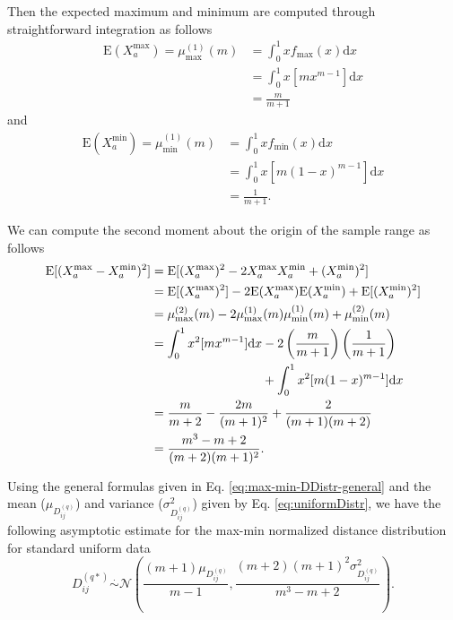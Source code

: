 \documentclass[10pt,letterpaper]{article}\usepackage[]{graphicx}\usepackage[]{color}
\begin{document}
Then the expected maximum and minimum are computed through straightforward integration as follows
%
\begin{equation}\label{eq:mu_max_uniform}
\begin{aligned}
\text{E}(X^\text{max}_a) = \mu^{(1)}_\text{max}(m) &= \int_{0}^{1} x f_\text{max}(x) \text{d}x \\
&= \int_{0}^{1} x [m x^{m-1}] \text{d}x \\
&= \frac{m}{m+1}
\end{aligned}
\end{equation}
%
and
%
\begin{equation}\label{eq:mu_min_uniform}
\begin{aligned}
\text{E}(X^\text{min}_a) = \mu^{(1)}_\text{min}(m) &= \int_{0}^{1} x f_\text{min}(x) \text{d}x \\
&= \int_{0}^{1} x [m (1 - x)^{m-1}] \text{d}x \\
&= \frac{1}{m+1}.
\end{aligned}
\end{equation}

We can compute the second moment about the origin of the sample range as follows
%
\begin{equation}\label{eq:mu2_rng_uniform}
\begin{aligned}
\text{E}[(X^\text{max}_a - X^\text{min}_a)^2] &= \text{E}[(X^\text{max}_a)^2 - 2 X^\text{max}_a X^\text{min}_a + (X^\text{min}_a)^2] \\
&= \text{E}[(X^\text{max}_a)^2] - 2 \text{E}(X^\text{max}_a) \text{E}(X^\text{min}_a) + \text{E}[(X^\text{min}_a)^2] \\
&= \mu^{(2)}_\text{max}(m) - 2 \mu^{(1)}_\text{max}(m) \mu^{(1)}_\text{min}(m) + \mu^{(2)}_\text{min}(m) \\
&= \int_{0}^{1} x^2 [m x^{m-1}] \text{d}x - 2 \left(\frac{m}{m+1}\right) \left(\frac{1}{m+1}\right) \\
& \hspace{3.12cm} + \int_{0}^{1} x^2 [m (1 - x)^{m-1}] \text{d}x \\
&= \frac{m}{m+2} - \frac{2m}{(m+1)^2} + \frac{2}{(m+1)(m+2)} \\
&= \frac{m^3 - m + 2}{(m+2)(m+1)^2}.
\end{aligned}
\end{equation}

Using the general formulas given in Eq. \ref{eq:max-min-DDistr-general} and the mean ($\mu_{D^{(q)}_{ij}}$) and variance ($\sigma^2_{D^{(q)}_{ij}}$) given by Eq. \ref{eq:uniformDistr}, we have the following asymptotic estimate for the max-min normalized distance distribution for standard uniform data
%
\begin{equation}\label{eq:max-min_DDistr_uniform}
D^{(q*)}_{ij} \overset{.}{\sim} \mathcal{N}\left(\frac{(m+1)\mu_{D^{(q)}_{ij}}}{m-1}, \frac{(m+2)(m+1)^2 \sigma^2_{D^{(q)}_{ij}}}{m^3 - m + 2}\right).
\end{equation}
\end{document}
